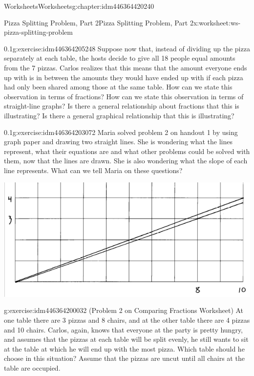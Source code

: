 \documentclass[twoside,11pt,]{book}
\begin{document}
\begin{chapterptx}{Worksheets}{}{Worksheets}{}{}{g:chapter:idm446364420240}
\begin{worksheet-section-numberless}{Pizza Splitting Problem, Part 2}{}{Pizza Splitting Problem, Part 2}{}{}{x:worksheet:ws-pizza-splitting-problem}
\begin{divisionexercise}{2}{}{0.1}{g:exercise:idm446364205248}
Suppose now that, instead of dividing up the pizza separately at each table, the hosts decide to give all 18 people equal amounts from the 7 pizzas.  Carlos realizes that this means that the amount everyone ends up with is in between the amounts they would have ended up with if each pizza had only been shared among those at the same table.  How can we state this observation in terms of fractions?  How can we state this observation in terms of straight-line graphs?  Is there a general relationship about fractions that this is illustrating?  Is there a general graphical relationship that this is illustrating?%
\end{divisionexercise}%
\clearpage
\begin{divisionexercise}{3}{}{0.1}{g:exercise:idm446364203072}%
Maria solved problem 2 on handout 1 by using graph paper and drawing two straight lines.  She is wondering what the lines represent, what their equations are and what other problems could be solved with them, now that the lines are drawn.  She is also wondering what the slope of each line represents.  What can we tell Maria on these questions?%
\begin{sidebyside}{1}{0.05}{0.05}{0}%
\begin{sbspanel}{0.9}%
\includegraphics[width=1\linewidth]{images/pizza-splitting-problem.png}
\end{sbspanel}%
\end{sidebyside}%
\end{divisionexercise}%
\begin{divisionexercise}{4}{}{}{g:exercise:idm446364200032}%
(Problem 2 on Comparing Fractions Worksheet) At one table there are 3 pizzas and 8 chairs, and at the other table there are 4 pizzas and 10 chairs.  Carlos, again, knows that everyone at the party is pretty hungry, and assumes that the pizzas at each table will be split evenly, he still wants to sit at the table at which he will end up with the most pizza.  Which table should he choose in this situation? Assume that the pizzas are uncut until all chairs at the table are occupied.%

\end{divisionexercise}
\end{worksheet-section-numberless}
\end{chapterptx}
\end{document}
